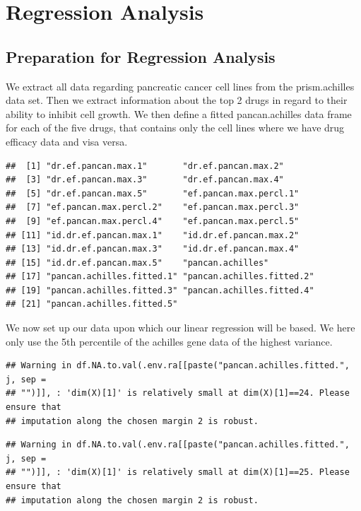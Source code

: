 \documentclass[
]{article}
\begin{document}
\hypertarget{regression-analysis}{%
\section{Regression Analysis}\label{regression-analysis}}

\hypertarget{preparation-for-regression-analysis}{%
\subsection{Preparation for Regression
Analysis}\label{preparation-for-regression-analysis}}

We extract all data regarding pancreatic cancer cell lines from the
prism.achilles data set. Then we extract information about the top 2
drugs in regard to their ability to inhibit cell growth. We then define
a fitted pancan.achilles data frame for each of the five drugs, that
contains only the cell lines where we have drug efficacy data and visa
versa.

\begin{verbatim}
##  [1] "dr.ef.pancan.max.1"       "dr.ef.pancan.max.2"      
##  [3] "dr.ef.pancan.max.3"       "dr.ef.pancan.max.4"      
##  [5] "dr.ef.pancan.max.5"       "ef.pancan.max.percl.1"   
##  [7] "ef.pancan.max.percl.2"    "ef.pancan.max.percl.3"   
##  [9] "ef.pancan.max.percl.4"    "ef.pancan.max.percl.5"   
## [11] "id.dr.ef.pancan.max.1"    "id.dr.ef.pancan.max.2"   
## [13] "id.dr.ef.pancan.max.3"    "id.dr.ef.pancan.max.4"   
## [15] "id.dr.ef.pancan.max.5"    "pancan.achilles"         
## [17] "pancan.achilles.fitted.1" "pancan.achilles.fitted.2"
## [19] "pancan.achilles.fitted.3" "pancan.achilles.fitted.4"
## [21] "pancan.achilles.fitted.5"
\end{verbatim}

We now set up our data upon which our linear regression will be based.
We here only use the 5th percentile of the achilles gene data of the
highest variance.

\begin{verbatim}
## Warning in df.NA.to.val(.env.ra[[paste("pancan.achilles.fitted.", j, sep =
## "")]], : 'dim(X)[1]' is relatively small at dim(X)[1]==24. Please ensure that
## imputation along the chosen margin 2 is robust.
\end{verbatim}

\begin{verbatim}
## Warning in df.NA.to.val(.env.ra[[paste("pancan.achilles.fitted.", j, sep =
## "")]], : 'dim(X)[1]' is relatively small at dim(X)[1]==25. Please ensure that
## imputation along the chosen margin 2 is robust.
\end{verbatim}
\end{document}
